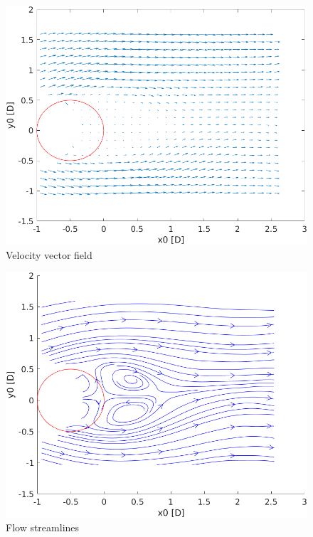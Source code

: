 \documentclass[12pt]{article}
\begin{document}
        \begin{figure}[ht!]
                \centering
                \includegraphics[width=\textwidth]{Vector_Field.png}
                \caption{Velocity vector field}
                \label{fig:vf}
        \end{figure}

        \begin{figure}[ht!]
                \centering
                \includegraphics[width=\textwidth]{Streamlines.png}
                \caption{Flow streamlines}
                \label{fig:streamlines}
        \end{figure}
\end{document}
